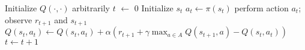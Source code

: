\begin{algorithmic}[1]
\State Initialize $Q(\cdot,\cdot)$ arbitrarily
   \State $t$ $\leftarrow$ 0
   \State Initialize $s_{t}$
   \Repeat
      \State $a_{t} \gets \pi(s_{t})$
      \State perform action $a_{t}$; observe $r_{t+1}$ and $s_{t+1}$
      \State $Q(s_{t},a_{t}) \gets Q(s_t,a_t) + \alpha( r_{t+1} + \gamma \max_{a\in A} Q(s_{t+1},a) -  Q(s_t,a_t))$
      \State $t \gets t+1$
\EndFor
\end{algorithmic}
